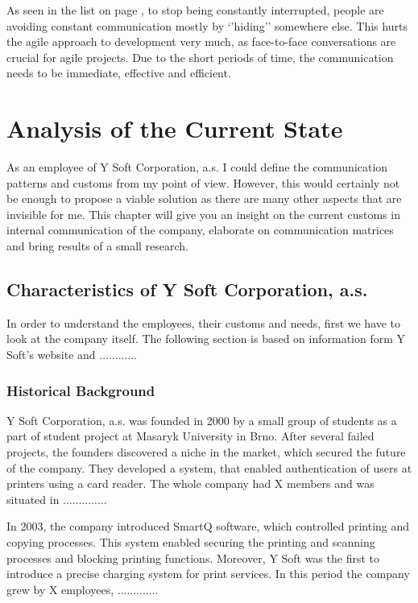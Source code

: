 \documentclass[11pt,singleside]{myfithesis2}
\begin{document}
As seen in the list on page \pageref{list:avoidingCommunication}, to stop being constantly interrupted, people are avoiding constant communication mostly by `'hiding'' somewhere else. This hurts the agile approach to development very much, as face-to-face conversations are crucial for agile projects. Due to the short periods of time, the communication needs to be immediate, effective and efficient.
	
	
\chapter{Analysis of the Current State}

As an employee of Y Soft Corporation, a.s. I could define the communication patterns and customs from my point of view. However, this would certainly not be enough to propose a viable solution as there are many other aspects that are invisible for me. This chapter will give you an insight on the current customs in internal communication of the company, elaborate on communication matrices and bring results of a small research.

	\section{Characteristics of Y Soft Corporation, a.s.}
In order to understand the employees, their customs and needs, first we have to look at the company itself. The following section is based on information form Y Soft's website \cite{ysoft} and ............

		\subsection{Historical Background}

Y Soft Corporation, a.s. was founded in 2000 by a small group of students as a part of student project at Masaryk University in Brno. After several failed projects, the founders discovered a niche in the market, which secured the future of the company. They developed a system, that enabled authentication of users at printers using a card reader. The whole company had X members and was situated in ..............

In 2003, the company introduced SmartQ software, which controlled printing and copying processes. This system enabled securing the printing and scanning processes and blocking printing functions. Moreover, Y Soft was the first to introduce a precise charging system for print services. In this period the company grew by X employees, .............
\end{document}

